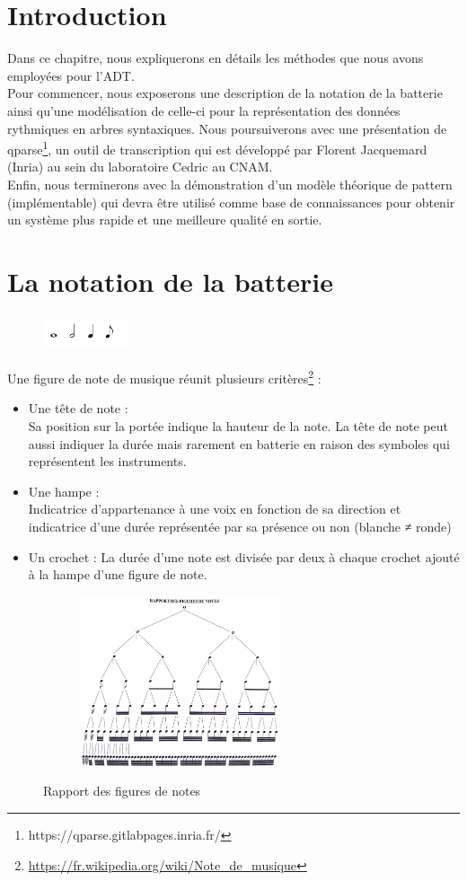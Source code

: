 \section*{Introduction}
Dans ce chapitre, nous expliquerons en détails les méthodes que nous avons employées pour l’ADT.\\
Pour commencer, nous exposerons une description de la notation de la batterie ainsi qu’une modélisation de celle-ci pour la représentation des données rythmiques en arbres syntaxiques. Nous poursuiverons avec une présentation de qparse\footnote{https://qparse.gitlabpages.inria.fr/}, un outil de transcription qui est développé par Florent Jacquemard (Inria) au sein du laboratoire Cedric au CNAM.\\
Enfin, nous terminerons avec la démonstration d’un modèle théorique de pattern (implémentable) qui devra être utilisé comme base de connaissances pour obtenir un système plus rapide et une meilleure qualité en sortie. 
\section{La notation de la batterie}
\begin{figure}[h]
	\centering
	\includegraphics[height=10mm, width=25mm]{z_images/3_methodes/figures_de_notes.png}
\end{figure}
Une figure de note \cite{danhauser} de musique réunit plusieurs critères\footnote{\url{https://fr.wikipedia.org/wiki/Note_de_musique}} :
\begin{itemize}
	\item Une tête de note :\\
	Sa position sur la portée indique la hauteur de la note. La tête de note peut aussi indiquer la durée mais rarement en batterie en raison des symboles qui représentent les instruments.
	\item Une hampe :\\
	Indicatrice d’appartenance à une voix en fonction de sa direction et indicatrice d’une durée représentée par sa présence ou non (blanche ≠ ronde)
	\item Un crochet : La durée d’une note est divisée par deux à chaque crochet ajouté à la hampe d’une figure de note.
\end{itemize}
\begin{figure}[h]
	\centering
	\includegraphics[height=50mm, width=80mm]{z_images/3_methodes/rapport_figures_notes.png}
	\caption{Rapport des figures de notes}\cite{danhauser}
\end{figure}

